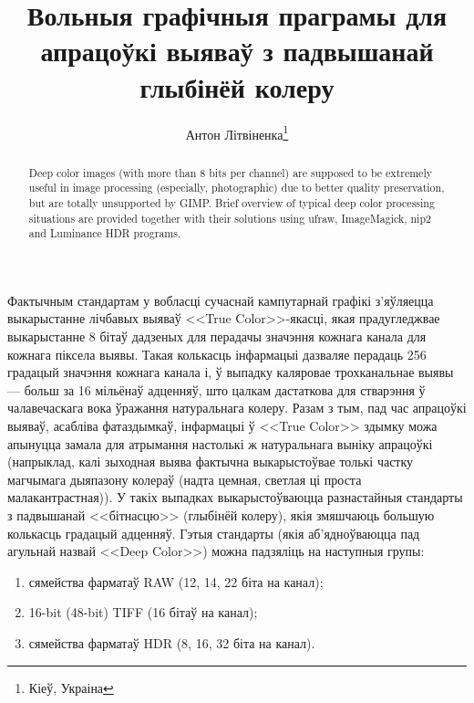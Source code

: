 \documentclass[10pt, a5paper]{article}
\begin{document}
\title{Вольныя графічныя праграмы для апрацоўкі выяваў з падвышанай глыбінёй колеру}%

\author{Антон Літвіненка\footnote{Кіеў, Украіна}}
\maketitle

 \begin{abstract}
  Deep color images (with more than 8 bits per channel) are supposed to be extremely useful in image processing (especially, photographic) due to better quality preservation, but are totally unsupported by GIMP. Brief overview of typical deep color processing situations are provided together with their solutions using ufraw, ImageMagick, nip2 and Luminance HDR programs.
 \end{abstract}

Фактычным стандартам у вобласці сучаснай кампутарнай графікі з'яўляецца выкарыстанне лічбавых выяваў <<True Color>>-якасці, якая прадугледжвае выкарыстанне 8 бітаў дадзеных для перадачы значэння кожнага канала для кожнага піксела выявы. Такая колькасць інфармацыі дазваляе перадаць 256 градацый значэння кожнага канала і, ў выпадку каляровае трохканальнае выявы --- больш за 16 мільёнаў адценняў, што цалкам дастаткова для стварэння ў чалавечаскага вока ўражання натуральнага колеру. Разам з тым, пад час апрацоўкі выяваў, асабліва фатаздымкаў, інфармацыі ў <<True Color>> здымку можа апынуцца замала для атрымання настолькі ж натуральнага выніку апрацоўкі (напрыклад, калі зыходная выява фактычна выкарыстоўвае толькі частку магчымага дыяпазону колераў (надта цемная, светлая ці проста малакантрастная)). У такіх выпадках выкарыстоўваюцца разнастайныя стандарты з падвышанай <<бітнасцю>> (глыбінёй колеру), якія змяшчаюць большую колькасць градацый адценняў. Гэтыя стандарты (якія аб'ядноўваюцца пад агульнай назвай <<Deep Color>>) можна падзяліць на наступныя групы:

\begin{enumerate}
 \item сямейства фарматаў RAW (12, 14, 22 біта на канал);
 \item 16-bit (48-bit) TIFF (16 бітаў на канал);
 \item сямейства фарматаў HDR (8, 16, 32 біта на канал).
\end{enumerate}
 
\end{document}
